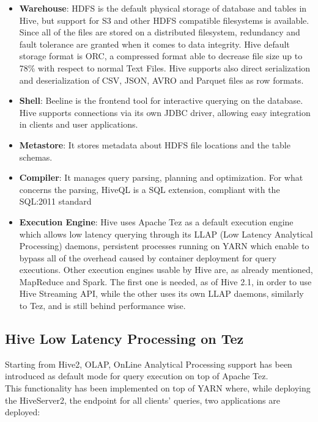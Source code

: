 \begin{itemize}
    \item \textbf{Warehouse}: HDFS is the default physical storage of database and tables in Hive, but support for S3 and other HDFS compatible filesystems is available. Since all of the files are stored on a distributed filesystem, redundancy and fault tolerance are granted when it comes to data integrity. Hive default storage format is ORC, a compressed format able to decrease file size up to 78\% with respect to normal Text Files. Hive supports also direct serialization and deserialization of CSV, JSON, AVRO and Parquet files as row formats.
    \item \textbf{Shell}: Beeline is the frontend tool for interactive querying on the database. Hive supports connections via its own JDBC driver, allowing easy integration in clients and user applications.
    \item \textbf{Metastore}: It stores metadata about HDFS file locations and the table schemas.
    \item \textbf{Compiler}: It manages query parsing, planning and optimization. For what concerns the parsing, HiveQL is a SQL extension, compliant with the SQL:2011 standard
    \item \textbf{Execution Engine}: Hive uses Apache Tez as a default execution engine  which allows low latency querying through its LLAP (Low Latency Analytical Processing) daemons, persistent processes running on YARN which enable to bypass all of the overhead caused by container deployment for query executions. Other execution engines usable by Hive are, as already mentioned, MapReduce and Spark. The first one is needed, as of Hive 2.1, in order to use Hive Streaming API, while the other uses its own LLAP daemons, similarly to Tez, and is still behind performance wise.
\end{itemize}

\subsection{Hive Low Latency Processing on Tez}

Starting from Hive2, OLAP, OnLine Analytical Processing support has been introduced as default mode for query execution on top of Apache Tez.\\  
This functionality has been implemented on top of YARN where, while deploying the HiveServer2, the endpoint for all clients' queries, two applications are deployed: 

